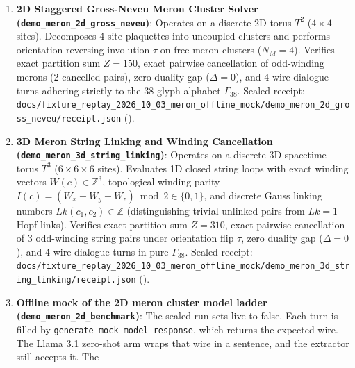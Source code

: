 \documentclass[
  11pt,
]{article}
\begin{document}
\begin{enumerate}
\def\labelenumi{\arabic{enumi}.}
\item
  \textbf{2D Staggered Gross-Neveu Meron Cluster Solver
  (\texttt{demo\_\allowbreak{}meron\_\allowbreak{}2d\_\allowbreak{}gross\_\allowbreak{}neveu})}:
  Operates on a discrete 2D torus \(T^2\) (\(4 \times 4\) sites).
  Decomposes 4-site plaquettes into uncoupled clusters and performs
  orientation-reversing involution \(\tau\) on free meron clusters
  (\(N_M = 4\)). Verifies exact partition sum \(Z = 150\), exact
  pairwise cancellation of odd-winding merons (2 cancelled pairs), zero
  duality gap (\(\Delta = 0\)), and 4 wire dialogue turns adhering
  strictly to the 38-glyph alphabet \(\Gamma_{38}\). Sealed receipt:
  \texttt{docs/\allowbreak{}fixture\_replay\_2026\_10\_03\_meron\_offline\_mock/\allowbreak{}demo\_\allowbreak{}meron\_\allowbreak{}2d\_\allowbreak{}gross\_\allowbreak{}neveu/\allowbreak{}receipt.json}
  (\texttt{}).
\item
  \textbf{3D Meron String Linking and Winding Cancellation
  (\texttt{demo\_\allowbreak{}meron\_\allowbreak{}3d\_\allowbreak{}string\_\allowbreak{}linking})}:
  Operates on a discrete 3D spacetime torus \(T^3\)
  (\(6 \times 6 \times 6\) sites). Evaluates 1D closed string loops with
  exact winding vectors \(W(c) \in \mathbb{Z}^3\), topological winding
  parity \(I(c) = (W_x + W_y + W_z) \bmod 2 \in \{0, 1\}\), and discrete
  Gauss linking numbers \(Lk(c_1, c_2) \in \mathbb{Z}\) (distinguishing
  trivial unlinked pairs from \(Lk = 1\) Hopf links). Verifies exact
  partition sum \(Z = 310\), exact pairwise cancellation of 3
  odd-winding string pairs under orientation flip \(\tau\), zero duality
  gap (\(\Delta = 0\)), and 4 wire dialogue turns in pure
  \(\Gamma_{38}\). Sealed receipt:
  \texttt{docs/\allowbreak{}fixture\_replay\_2026\_10\_03\_meron\_offline\_mock/\allowbreak{}demo\_\allowbreak{}meron\_\allowbreak{}3d\_\allowbreak{}string\_\allowbreak{}linking/\allowbreak{}receipt.json}
  (\texttt{}).
\item
  \textbf{Offline mock of the 2D meron cluster model ladder
  (\texttt{demo\_\allowbreak{}meron\_\allowbreak{}2d\_\allowbreak{}benchmark})}:
  The sealed run sets live to false. Each turn is filled by
  \texttt{generate\_\allowbreak{}mock\_\allowbreak{}model\_\allowbreak{}response},
  which returns the expected wire. The Llama 3.1 zero-shot arm wraps
  that wire in a sentence, and the extractor still accepts it. The

\end{enumerate}
\end{document}

